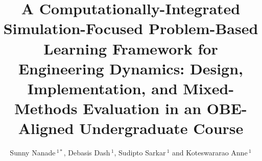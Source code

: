 \documentclass[utf8]{FrontiersinHarvard}
\def\firstAuthorLast{Nanade {et~al.}}
\def\Authors{Sunny Nanade\,$^{1*}$, Debasis Dash\,$^{1}$, Sudipto Sarkar\,$^{1}$ and Koteswararao Anne\,$^{1}$}
\begin{document}
\onecolumn
{}

\title[SF-PBL for Engineering Dynamics]{%
  A Computationally-Integrated Simulation-Focused Problem-Based Learning
  Framework for Engineering Dynamics: Design, Implementation, and
  Mixed-Methods Evaluation in an OBE-Aligned Undergraduate Course}

\author[\firstAuthorLast]{\Authors}
\address{}
\correspondance{}
\extraAuth{}

\maketitle

\begin{abstract}

\section{}


\end{abstract}
\end{document}
